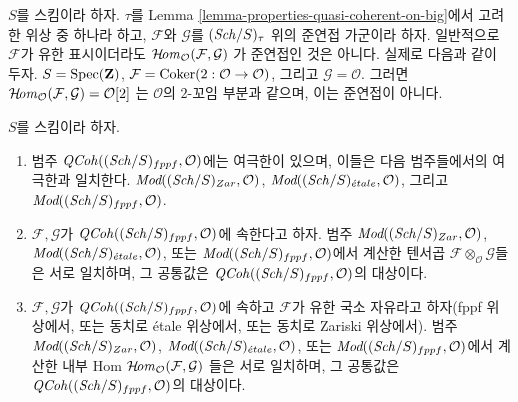\begin{example}
\label{example-internal-hom-not-qcoh}
$S$를 스킴이라 하자. $\tau$를 Lemma
\ref{lemma-properties-quasi-coherent-on-big}에서 고려한 위상 중 하나라 하고,
$\mathcal{F}$와 $\mathcal{G}$를 $(\mathit{Sch}/S)_\tau$ 위의 준연접 가군이라 하자.
일반적으로 $\mathcal{F}$가 유한 표시이더라도
$\mathop{\mathcal{H}\!\mathit{om}}\nolimits_\mathcal{O}(\mathcal{F}, \mathcal{G})$
가 준연접인 것은 아니다. 실제로 다음과 같이 두자.
$S = \mathop{\mathrm{Spec}}(\mathbf{Z})$,
$\mathcal{F} = \mathop{\mathrm{Coker}}(2 : \mathcal{O} \to \mathcal{O})$,
그리고 $\mathcal{G} = \mathcal{O}$. 그러면
$\mathop{\mathcal{H}\!\mathit{om}}\nolimits_\mathcal{O}(\mathcal{F}, \mathcal{G}) = \mathcal{O}[2]$
는 $\mathcal{O}$의 $2$-꼬임 부분과 같으며, 이는 준연접이 아니다.
\end{example}

\begin{lemma}
\label{lemma-qc-colimits}
$S$를 스킴이라 하자.
\begin{enumerate}
\item 범주 $\mathit{QCoh}((\mathit{Sch}/S)_{fppf}, \mathcal{O})$에는 여극한이 있으며,
이들은 다음 범주들에서의 여극한과 일치한다.
$\textit{Mod}((\mathit{Sch}/S)_{Zar}, \mathcal{O})$,
$\textit{Mod}((\mathit{Sch}/S)_{\acute{e}tale}, \mathcal{O})$, 그리고
$\textit{Mod}((\mathit{Sch}/S)_{fppf}, \mathcal{O})$.
\item $\mathcal{F}, \mathcal{G}$가
$\mathit{QCoh}((\mathit{Sch}/S)_{fppf}, \mathcal{O})$에 속한다고 하자. 범주
$\textit{Mod}((\mathit{Sch}/S)_{Zar}, \mathcal{O})$,
$\textit{Mod}((\mathit{Sch}/S)_{\acute{e}tale}, \mathcal{O})$, 또는
$\textit{Mod}((\mathit{Sch}/S)_{fppf}, \mathcal{O})$에서 계산한 텐서곱
$\mathcal{F} \otimes_\mathcal{O} \mathcal{G}$들은 서로 일치하며, 그 공통값은
$\mathit{QCoh}((\mathit{Sch}/S)_{fppf}, \mathcal{O})$의 대상이다.
\item $\mathcal{F}, \mathcal{G}$가
$\mathit{QCoh}((\mathit{Sch}/S)_{fppf}, \mathcal{O})$에 속하고 $\mathcal{F}$가 유한
국소 자유라고 하자(fppf 위상에서, 또는 동치로 \'etale 위상에서,
또는 동치로 Zariski 위상에서). 범주
$\textit{Mod}((\mathit{Sch}/S)_{Zar}, \mathcal{O})$,
$\textit{Mod}((\mathit{Sch}/S)_{\acute{e}tale}, \mathcal{O})$, 또는
$\textit{Mod}((\mathit{Sch}/S)_{fppf}, \mathcal{O})$에서 계산한 내부 Hom
$\mathop{\mathcal{H}\!\mathit{om}}\nolimits_\mathcal{O}(\mathcal{F}, \mathcal{G})$
들은 서로 일치하며, 그 공통값은
$\mathit{QCoh}((\mathit{Sch}/S)_{fppf}, \mathcal{O})$의 대상이다.
\end{enumerate}
\end{lemma}

